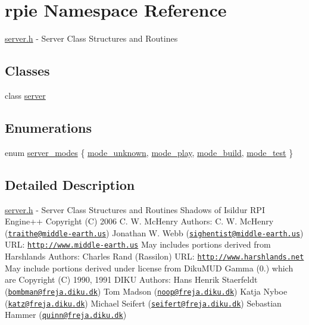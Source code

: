 \hypertarget{namespacerpie}{\section{rpie Namespace Reference}
\label{namespacerpie}
}


\hyperlink{server_8h}{server.\-h} -\/ Server Class Structures and Routines  


\subsection*{Classes}
\begin{DoxyCompactItemize}
\item 
class \hyperlink{classrpie_1_1server}{server}
\end{DoxyCompactItemize}
\subsection*{Enumerations}
\begin{DoxyCompactItemize}
\item 
enum \hyperlink{namespacerpie_a54d73f12f21f2462f5c243b3de21d943}{server\-\_\-modes} \{ \hyperlink{namespacerpie_a54d73f12f21f2462f5c243b3de21d943adb11d36e6c1dac4c7d929755633f16c3}{mode\-\_\-unknown}, 
\hyperlink{namespacerpie_a54d73f12f21f2462f5c243b3de21d943aabf1d3384a047845800aacb1f674d3d6}{mode\-\_\-play}, 
\hyperlink{namespacerpie_a54d73f12f21f2462f5c243b3de21d943aca26b4f6631c41b4faff764d83f6cddb}{mode\-\_\-build}, 
\hyperlink{namespacerpie_a54d73f12f21f2462f5c243b3de21d943a7ccb2886249cd7c12e6478323532b6e2}{mode\-\_\-test}
 \}
\end{DoxyCompactItemize}


\subsection{Detailed Description}
\hyperlink{server_8h}{server.\-h} -\/ Server Class Structures and Routines Shadows of Isildur R\-P\-I Engine++ Copyright (C) 2006 C. W. Mc\-Henry Authors\-: C. W. Mc\-Henry (\href{mailto:traithe@middle-earth.us}{\tt traithe@middle-\/earth.\-us}) Jonathan W. Webb (\href{mailto:sighentist@middle-earth.us}{\tt sighentist@middle-\/earth.\-us}) U\-R\-L\-: \href{http://www.middle-earth.us}{\tt http\-://www.\-middle-\/earth.\-us} May includes portions derived from Harshlands Authors\-: Charles Rand (Rassilon) U\-R\-L\-: \href{http://www.harshlands.net}{\tt http\-://www.\-harshlands.\-net} May include portions derived under license from Diku\-M\-U\-D Gamma (0.) which are Copyright (C) 1990, 1991 D\-I\-K\-U Authors\-: Hans Henrik Staerfeldt (\href{mailto:bombman@freja.diku.dk}{\tt bombman@freja.\-diku.\-dk}) Tom Madson (\href{mailto:noop@freja.diku.dk}{\tt noop@freja.\-diku.\-dk}) Katja Nyboe (\href{mailto:katz@freja.diku.dk}{\tt katz@freja.\-diku.\-dk}) Michael Seifert (\href{mailto:seifert@freja.diku.dk}{\tt seifert@freja.\-diku.\-dk}) Sebastian Hammer (\href{mailto:quinn@freja.diku.dk}{\tt quinn@freja.\-diku.\-dk}) 

